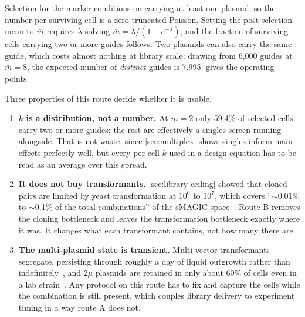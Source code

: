 Selection for the marker conditions on
carrying at least one plasmid, so the number per surviving cell is a
zero-truncated Poisson. Setting the post-selection mean to $\bar m$ requires
$\lambda$ solving $\bar m = \lambda/(1-e^{-\lambda})$, and the fraction of
surviving cells carrying two or more guides follows. Two plasmids can also carry
the same guide, which costs almost nothing at library scale: drawing from 6{,}000
guides at $\bar m = 8$, the expected number of \emph{distinct} guides is 7.995.
 gives the operating points.



Three properties of this route decide whether it is usable.

\begin{enumerate}
\item \textbf{$k$ is a distribution, not a number.} At $\bar m = 2$ only 59.4\%
  of selected cells carry two or more guides; the rest are effectively a
  singles screen running alongside. That is not waste, since \cref{sec:multiplex}
  shows singles inform main effects perfectly well, but every per-cell $k$ used
  in a design equation has to be read as an average over this spread.
\item \textbf{It does not buy transformants.} \cref{sec:library-ceiling} showed
  that cloned pairs are limited by yeast transformation at $10^{6}$ to $10^{7}$,
  which covers ``$\sim$0.01\% to $\sim$0.1\% of the total combinations''
  of the sMAGIC space~\citep{lianMultifunctionalGenomewideCRISPR2019}. Route B
  removes the cloning bottleneck and leaves the transformation bottleneck
  exactly where it was. It changes what each transformant contains, not how many
  there are.
\item \textbf{The multi-plasmid state is transient.} Multi-vector transformants
  segregate, persisting through roughly a day of liquid outgrowth rather than
  indefinitely~\citep{scanlonQuantifyingResolvingMultiple2009}, and 2$\mu$
  plasmids are retained in only about 60\% of cells even in a lab
  strain~\citep{haysNaturalVariantEssential2020}. Any protocol on this route has
  to fix and capture the cells while the combination is still present, which
  couples library delivery to experiment timing in a way route A does not.
\end{enumerate}

